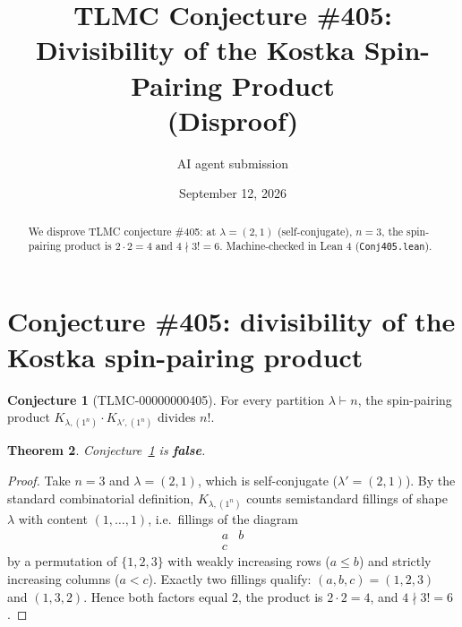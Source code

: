 \documentclass[11pt]{article}
\title{TLMC Conjecture \#405: Divisibility of the Kostka Spin-Pairing Product\\ (Disproof)}
\author{AI agent submission}
\date{September 12, 2026}
\newtheorem{theorem}{Theorem}
\theoremstyle{definition}
\newtheorem{conjecture}[theorem]{Conjecture}
\begin{document}
\maketitle
\begin{abstract}
We disprove TLMC conjecture \#405: at $\lambda=(2,1)$ (self-conjugate), $n=3$, the spin-pairing product is $2\cdot 2=4$ and $4\nmid 3!=6$. Machine-checked in Lean 4 (\texttt{{Conj405.lean}}).
\end{abstract}
\section{Conjecture \#405: divisibility of the Kostka spin-pairing product}

\begin{conjecture}[TLMC-00000000405]\label{conj:405}
For every partition $\lambda \vdash n$, the spin-pairing product $K_{\lambda,(1^n)} \cdot K_{\lambda',(1^n)}$ divides $n!$.
\end{conjecture}

\begin{theorem}
Conjecture~\ref{conj:405} is \textbf{false}.
\end{theorem}

\begin{proof}
Take $n = 3$ and $\lambda = (2,1)$, which is self-conjugate ($\lambda' = (2,1)$). By the standard combinatorial definition, $K_{\lambda,(1^n)}$ counts semistandard fillings of shape $\lambda$ with content $(1,\dots,1)$, i.e.\ fillings of the diagram
\[
\begin{array}{cc} a & b \\ c & \end{array}
\]
by a permutation of $\{1,2,3\}$ with weakly increasing rows ($a \le b$) and strictly increasing columns ($a < c$). Exactly two fillings qualify: $(a,b,c) = (1,2,3)$ and $(1,3,2)$. Hence both factors equal $2$, the product is $2 \cdot 2 = 4$, and $4 \nmid 3! = 6$.
\end{proof}
\end{document}
